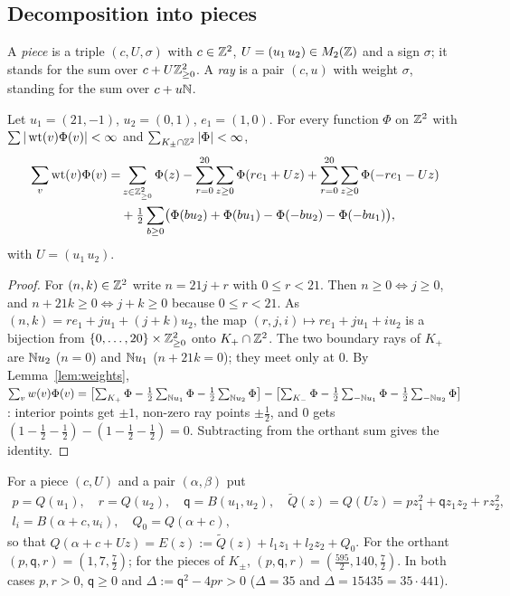 \subsection{Decomposition into pieces}
A \emph{piece} is a triple $(c,U,\sigma)$ with $c\in\mathbb{Z}^2$, $U=(u_1\,u_2)\in M_2(\mathbb{Z})$ and a sign $\sigma$; it stands for the sum over $c+U\mathbb{Z}^2_{\ge0}$. A \emph{ray}
is a pair $(c,u)$ with weight $\sigma$, standing for the sum over $c+u\mathbb{N}$.
\begin{proposition}\label{prop:decomp}
Let $u_1=(21,-1)$, $u_2=(0,1)$, $e_1=(1,0)$. For every function $\Phi$ on $\mathbb{Z}^2$ with $\sum|\operatorname{wt}(v)\Phi(v)|<\infty$ and $\sum_{K_\pm\cap\mathbb{Z}^2}|\Phi|<\infty$,
\begin{align*}
\sum_v\operatorname{wt}(v)\Phi(v)=&\sum_{z\in\mathbb{Z}^2_{\ge0}}\Phi(z)-\sum_{r=0}^{20}\sum_{z\ge0}\Phi(re_1+Uz)+\sum_{r=0}^{20}\sum_{z\ge0}\Phi(-re_1-Uz)\\
&+\tfrac12\sum_{b\ge0}\bigl(\Phi(bu_2)+\Phi(bu_1)-\Phi(-bu_2)-\Phi(-bu_1)\bigr),
\end{align*}
with $U=(u_1\,u_2)$.
\end{proposition}
\begin{proof}
For $(n,k)\in\mathbb{Z}^2$ write $n=21j+r$ with $0\le r<21$. Then $n\ge0\iff j\ge0$, and $n+21k\ge0\iff j+k\ge0$ because $0\le r<21$. As
$(n,k)=re_1+ju_1+(j+k)u_2$, the map $(r,j,i)\mapsto re_1+ju_1+iu_2$ is a bijection from $\{0,\dots,20\}\times\mathbb{Z}^2_{\ge0}$ onto $K_+\cap\mathbb{Z}^2$.
The two boundary rays of $K_+$ are $\mathbb{N} u_2$ ($n=0$) and $\mathbb{N} u_1$ ($n+21k=0$); they meet only at $0$. By Lemma~\ref{lem:weights},
$\sum_vw(v)\Phi(v)=\bigl[\sum_{K_+}\Phi-\tfrac12\sum_{\mathbb{N} u_1}\Phi-\tfrac12\sum_{\mathbb{N} u_2}\Phi\bigr]-\bigl[\sum_{K_-}\Phi-\tfrac12\sum_{-\mathbb{N} u_1}\Phi-\tfrac12\sum_{-\mathbb{N} u_2}\Phi\bigr]$:
interior points get $\pm1$, non-zero ray points $\pm\tfrac12$, and $0$ gets $(1-\tfrac12-\tfrac12)-(1-\tfrac12-\tfrac12)=0$. Subtracting from the orthant sum gives the identity.
\end{proof}
For a piece $(c,U)$ and a pair $(\alpha,\beta)$ put
\begin{gather*}
p=Q(u_1),\quad r=Q(u_2),\quad \mathsf q=B(u_1,u_2),\quad \tilde Q(z)=Q(Uz)=pz_1^2+\mathsf qz_1z_2+rz_2^2,\\
l_i=B(\alpha+c,u_i),\quad Q_0=Q(\alpha+c),
\end{gather*}
so that $Q(\alpha+c+Uz)=E(z):=\tilde Q(z)+l_1z_1+l_2z_2+Q_0$. For the orthant $(p,\mathsf q,r)=(1,7,\tfrac72)$; for the pieces of $K_\pm$,
$(p,\mathsf q,r)=(\tfrac{595}2,140,\tfrac72)$. In both cases $p,r>0$, $\mathsf q\ge0$ and $\Delta:=\mathsf q^2-4pr>0$ ($\Delta=35$ and $\Delta=15435=35\cdot441$).

